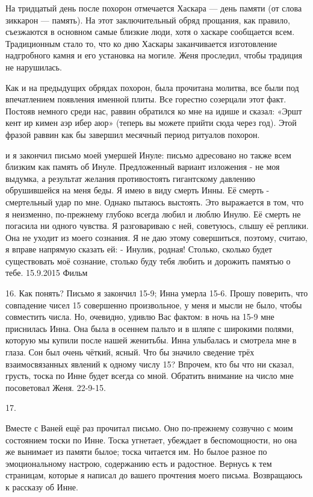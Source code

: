 На тридцатый день после похорон отмечается Хаскара — день памяти (от слова зиккарон — память). На этот заключительный обряд прощания, как правило, съезжаются в основном самые близкие люди, хотя о хаскаре сообщается всем. Традиционным стало то, что ко дню Хаскары заканчивается изготовление надгробного камня и его установка на могиле. Женя проследил, чтобы традиция не нарушилась.

Как и на предыдущих обрядах похорон, была прочитана молитва, все были под впечатлением появления именной плиты. Все горестно созерцали этот факт. Постояв немного среди нас, раввин обратился ко мне на идише и сказал: «Эршт кент ир кимен аэр ибер аюр» (теперь вы можете прийти сюда через год). Этой фразой раввин как бы завершил месячный период ритуалов похорон.

и я закончил письмо моей умершей Инуле: письмо адресовано но также всем близким как память об Инуле. Предложенный вариант изложения - не моя выдумка, а результат желания противостоять гигантскому давлению обрушившейся на меня беды. Я имею в виду смерть Инны. Её смерть - смертельный удар по мне. Однако пытаюсь выстоять. Это выражается в том, что я неизменно, по-прежнему глубоко всегда любил и люблю Инулю. Её смерть не погасила ни одного чувства. Я разговариваю с ней, советуюсь, слышу её реплики. Она не уходит из моего сознания. Я не даю этому совершиться, поэтому, считаю, я вправе напрямую сказать ей: - Инулик, родная! Столько, сколько будет существовать моё сознание, столько буду тебя любить и дорожить памятью о тебе. 15.9.2015 Фильм

16.
Как понять? Письмо я закончил 15-9; Инна умерла 15-6. Прошу поверить, что совпадение чисел 15 совершенно произвольное, у меня и мысли не было, чтобы совместить числа. Но, очевидно, удивлю Вас фактом: в ночь на 15-9 мне приснилась Инна. Она была в осеннем пальто и в шляпе с широкими полями, которую мы купили после нашей женитьбы. Инна улыбалась и смотрела мне в глаза. Сон был очень чёткий, ясный. Что бы значило сведение трёх взаимосвязанных явлений к одному числу 15? Впрочем, кто бы что ни сказал, грусть, тоска по Инне будет всегда со мной. Обратить внимание на число мне посоветовал Женя. 22-9-15.

17.

Вместе с Ваней ещё раз прочитал письмо. Оно по-прежнему созвучно с моим состоянием тоски по Инне. Тоска угнетает, убеждает в беспомощности, но она же вынимает из памяти былое; тоска читается им. Но былое разное по эмоциональному настрою, содержанию есть и радостное. Вернусь к тем страницам, которые я написал до вашего прочтения моего письма. Возвращаюсь к рассказу об Инне.

